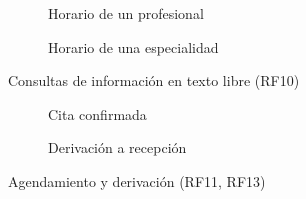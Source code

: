 \begin{figure}[H]
\centering
\begin{subfigure}[t]{0.48\linewidth}\centering{}\caption{Horario de un profesional}\end{subfigure}\hfill
\begin{subfigure}[t]{0.48\linewidth}\centering{}\caption{Horario de una especialidad}\end{subfigure}
\caption{Consultas de información en texto libre (RF10)}
\label{fig:ob3_conv_info}
\end{figure}

\begin{figure}[H]
\centering
\begin{subfigure}[t]{0.48\linewidth}\centering{}\caption{Cita confirmada}\end{subfigure}\hfill
\begin{subfigure}[t]{0.48\linewidth}\centering{}\caption{Derivación a recepción}\end{subfigure}
\caption{Agendamiento y derivación (RF11, RF13)}
\label{fig:ob3_conv_cita}
\end{figure}

